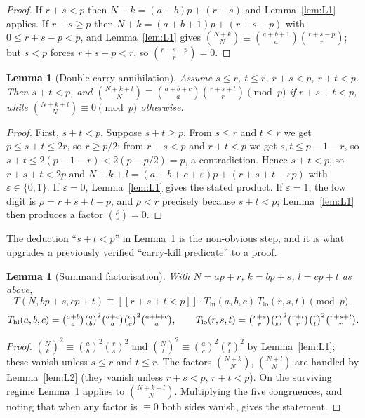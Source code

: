 \documentclass[11pt,reqno]{amsart}
\theoremstyle{plain}
\newtheorem{lemma}[theorem]{Lemma}
\theoremstyle{definition}
\theoremstyle{remark}
\numberwithin{equation}{section}
\newcommand{\ii}[1]{[\![#1]\!]}
\begin{document}
\begin{proof}
If $r+s<p$ then $N+k=(a+b)p+(r+s)$ and Lemma~\ref{lem:L1} applies. If $r+s\ge p$ then
$N+k=(a+b+1)p+(r+s-p)$ with $0\le r+s-p<p$, and Lemma~\ref{lem:L1} gives
$\binom{N+k}{N}\equiv\binom{a+b+1}{a}\binom{r+s-p}{r}$; but $s<p$ forces $r+s-p<r$, so
$\binom{r+s-p}{r}=0$.
\end{proof}

\begin{lemma}[Double carry annihilation]\label{lem:L3}
Assume $s\le r$, $t\le r$, $r+s<p$, $r+t<p$. Then $s+t<p$, and
$\binom{N+k+l}{N}\equiv\binom{a+b+c}{a}\binom{r+s+t}{r}\pmod p$ if $r+s+t<p$, while
$\binom{N+k+l}{N}\equiv0\pmod p$ otherwise.
\end{lemma}

\begin{proof}
First, $s+t<p$. Suppose $s+t\ge p$. From $s\le r$ and $t\le r$ we get $p\le s+t\le 2r$, so
$r\ge p/2$; from $r+s<p$ and $r+t<p$ we get $s,t\le p-1-r$, so $s+t\le2(p-1-r)<2(p-p/2)=p$, a
contradiction. Hence $s+t<p$, so $r+s+t<2p$ and $N+k+l=(a+b+c+\varepsilon)p+(r+s+t-\varepsilon p)$
with $\varepsilon\in\{0,1\}$. If $\varepsilon=0$, Lemma~\ref{lem:L1} gives the stated product.
If $\varepsilon=1$, the low digit is $\rho=r+s+t-p$, and $\rho<r$ precisely because $s+t<p$;
Lemma~\ref{lem:L1} then produces a factor $\binom{\rho}{r}=0$.
\end{proof}

The deduction ``$s+t<p$'' in Lemma~\ref{lem:L3} is the non-obvious step, and it is what
upgrades a previously verified ``carry-kill predicate'' to a proof.

\begin{lemma}[Summand factorisation]\label{lem:L4}
With $N=ap+r$, $k=bp+s$, $l=cp+t$ as above,
\[
T(N,bp+s,cp+t)\equiv\ii{r+s+t<p}\cdot T_{\mathrm{hi}}(a,b,c)\,T_{\mathrm{lo}}(r,s,t)\pmod p,
\]
\[
T_{\mathrm{hi}}(a,b,c)=\tbinom{a+b}{a}\tbinom{a}{b}^2\tbinom{a+c}{a}\tbinom{a}{c}^2\tbinom{a+b+c}{a},
\qquad
T_{\mathrm{lo}}(r,s,t)=\tbinom{r+s}{r}\tbinom{r}{s}^2\tbinom{r+t}{r}\tbinom{r}{t}^2\tbinom{r+s+t}{r}.
\]
\end{lemma}

\begin{proof}
$\binom{N}{k}^2\equiv\binom{a}{b}^2\binom{r}{s}^2$ and $\binom{N}{l}^2\equiv\binom{a}{c}^2\binom{r}{t}^2$
by Lemma~\ref{lem:L1}; these vanish unless $s\le r$ and $t\le r$. The factors
$\binom{N+k}{N}$, $\binom{N+l}{N}$ are handled by Lemma~\ref{lem:L2} (they vanish unless
$r+s<p$, $r+t<p$). On the surviving regime Lemma~\ref{lem:L3} applies to $\binom{N+k+l}{N}$.
Multiplying the five congruences, and noting that when any factor is $\equiv0$ both sides
vanish, gives the statement.
\end{proof}
\end{document}
